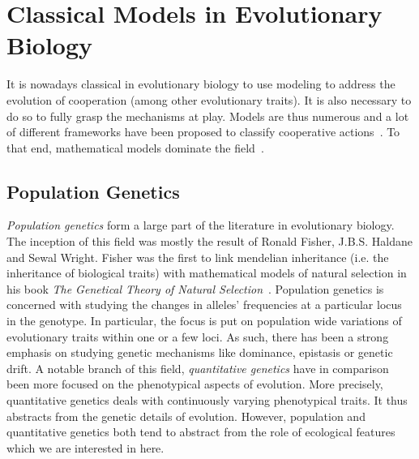 

\section{Classical Models in Evolutionary Biology}

    It is nowadays classical in evolutionary biology to use modeling to address the evolution of cooperation (among other evolutionary traits). It is also necessary to do so to fully grasp the mechanisms at play. Models are thus numerous and a lot of different frameworks have been proposed to classify cooperative actions~\parencite{Dugatkin2002, Sachs2004, Lehmann2006}. To that end, mathematical models dominate the field~\parencite{Servedio2014}. 

    \subsection{Population Genetics}

        \emph{Population genetics} form a large part of the literature in evolutionary biology. The inception of this field was mostly the result of Ronald Fisher, J.B.S. Haldane and Sewal Wright. Fisher was the first to link mendelian inheritance (i.e. the inheritance of biological traits) with mathematical models of natural selection in his book \textit{The Genetical Theory of Natural Selection}~\parencite{Fisher1930}. Population genetics is concerned with studying the changes in alleles' frequencies at a particular locus in the genotype. In particular, the focus is put on population wide variations of evolutionary traits within one or a few loci. As such, there has been a strong emphasis on studying genetic mechanisms like dominance, epistasis or genetic drift. A notable branch of this field, \emph{quantitative genetics} have in comparison been more focused on the phenotypical aspects of evolution. More precisely, quantitative genetics deals with continuously varying phenotypical traits. It thus abstracts from the genetic details of evolution. However, population and quantitative genetics both tend to abstract from the role of ecological features which we are interested in here.



